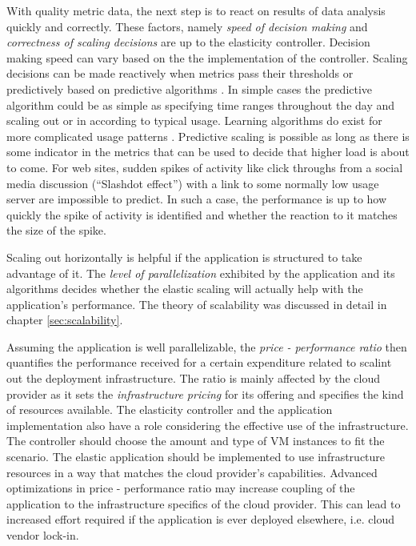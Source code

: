 \documentclass[english]{tktltiki2}
\theoremstyle{definition}
\theoremstyle{remark}
\begin{document}
With quality metric data, the next step is to react on results of data analysis
quickly and correctly. These factors, namely \textit{speed of decision making}
and \textit{correctness of scaling decisions} are up to the elasticity
controller. Decision making speed can vary based on the the implementation of
the controller. Scaling decisions can be made reactively when metrics pass their
thresholds or predictively based on predictive algorithms . In simple cases the
predictive algorithm could be as simple as specifying time ranges throughout the
day and scaling out or in according to typical usage. Learning algorithms do
exist for more complicated usage patterns . Predictive scaling is possible as long as there is some indicator
in the metrics that can be used to decide that higher load is about to come. For
web sites, sudden spikes of activity like click throughs from a social media
discussion (``Slashdot effect'') with a link to some normally low usage server
are impossible to predict. In such a case, the performance is up to how quickly
the spike of activity is identified and whether the reaction to it matches the
size of the spike.

Scaling out horizontally is helpful if the application is structured to take
advantage of it. The \textit{level of parallelization} exhibited by the
application and its algorithms decides whether the elastic scaling will actually
help with the application's performance. The theory of scalability was discussed
in detail in chapter \ref{sec:scalability}.

Assuming the application is well parallelizable, the \textit{price - performance
ratio} then quantifies the performance received for a certain expenditure
related to scalint out the deployment infrastructure. The ratio is mainly
affected by the cloud provider as it sets the \textit{infrastructure pricing}
for its offering and specifies the kind of resources available. The elasticity
controller and the application implementation also have a role considering the
effective use of the infrastructure. The controller should choose the amount and
type of VM instances to fit the scenario. The elastic application should be
implemented to use infrastructure resources in a way that matches the cloud
provider's capabilities. Advanced optimizations in price - performance ratio may
increase coupling of the application to the infrastructure specifics of the
cloud provider. This can lead to increased effort required if the application is
ever deployed elsewhere, i.e. cloud vendor lock-in.
\end{document}
